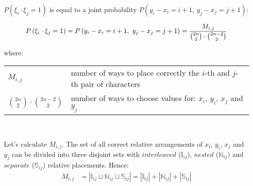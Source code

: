 \documentclass{article}
\makeatletter
\newenvironment{conditions}[1][where:]
  {#1 \begin{tabular}[t]{>{$}l<{$} @{${} - {}$} l}}
  {\end{tabular}\\[\belowdisplayskip]}
\makeatother
\begin{document}
$P\left( \xi_i \cdot \xi_j = 1 \right)$ is equal to a joint probability $P\left( y_i - x_i = i + 1,\   y_j - x_j = j + 1 \right)$:

\begin{equation} \label{eq:p_xi_i_xi_j}
P\left( \xi_i \cdot \xi_j = 1 \right) = P\left( y_i - x_i = i + 1,\   y_j - x_j = j + 1 \right) = {M_{i,j} \over {2n \choose 2} \cdot {2n - 2 \choose 2}}
\end{equation}

\begin{conditions} 
M_{i,j} & number of ways to place correctly the $i$-th and $j$-th pair of characters \\
{2n \choose 2} \cdot {2n - 2 \choose 2} & number of ways to choose values for: $x_i$, $y_i$, $x_j$ and $y_j$ \\
\end{conditions} 

Let's calculate $M_{i,j}$. The set of all correct relative arrangements of $x_i$, $y_i$, $x_j$ and $y_j$ can be divided into three disjoint sets with $interleaved$ ($\mathbb{I}_{ij}$), $nested$ ($\mathbb{N}_{ij}$) and $separate$ ($\mathbb{S}_{ij}$) relative placements. Hence:
\begin{equation}
\begin{split}
M_{i,j} & = \left| \mathbb{I}_{ij} \sqcup \mathbb{N}_{ij} \sqcup \mathbb{S}_{ij} \right| = \left| \mathbb{I}_{ij} \right| + \left| \mathbb{N}_{ij} \right| + \left| \mathbb{S}_{ij} \right|
\end{split}
\end{equation}
\end{document}
